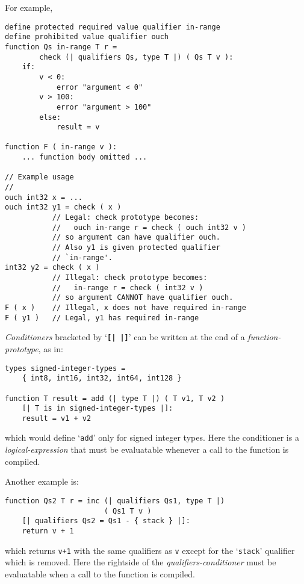 \documentclass[12pt]{article}
\newcommand{\TT}[1]{{\tt \bfseries #1}}
\newenvironment{indpar}[1][0.3in]%
	{\begin{list}{}%
		     {\setlength{\itemsep}{0in}%
		      \setlength{\topsep}{0in}%
		      \setlength{\parsep}{1ex}%
		      \setlength{\labelwidth}{#1}%
		      \setlength{\leftmargin}{#1}%
		      \addtolength{\leftmargin}{\labelsep}}%
	 \item}%
	{\end{list}}
\begin{document}
For example,
\begin{indpar}\begin{verbatim}
define protected required value qualifier in-range
define prohibited value qualifier ouch
function Qs in-range T r =
        check (| qualifiers Qs, type T |) ( Qs T v ):
    if:
        v < 0:
            error "argument < 0"
        v > 100:
            error "argument > 100"
        else:
            result = v

function F ( in-range v ):
    ... function body omitted ...

// Example usage
//
ouch int32 x = ...
ouch int32 y1 = check ( x )
           // Legal: check prototype becomes:
           //   ouch in-range r = check ( ouch int32 v )
           // so argument can have qualifier ouch.
           // Also y1 is given protected qualifier
           // `in-range'.
int32 y2 = check ( x )
           // Illegal: check prototype becomes:
           //   in-range r = check ( int32 v )
           // so argument CANNOT have qualifier ouch.
F ( x )    // Illegal, x does not have required in-range
F ( y1 )   // Legal, y1 has required in-range
\end{verbatim}\end{indpar}

{\em Conditioners} bracketed by `\TT{[|~|]}'
can be written at the end of a {\em function-prototype},
as in:
\begin{indpar}\begin{verbatim}
types signed-integer-types =
    { int8, int16, int32, int64, int128 }

function T result = add (| type T |) ( T v1, T v2 )
    [| T is in signed-integer-types |]:
    result = v1 + v2
\end{verbatim}\end{indpar}

which would define `{\tt add}' only for signed integer types.
Here the conditioner is a {\em logical-ex\-pres\-sion} that must
be evaluatable whenever a call to the function is compiled.

Another example is:
\begin{indpar}\begin{verbatim}
function Qs2 T r = inc (| qualifiers Qs1, type T |)
                       ( Qs1 T v )
    [| qualifiers Qs2 = Qs1 - { stack } |]:
    return v + 1
\end{verbatim}\end{indpar}

which returns {\tt v+1} with the same qualifiers as {\tt v}
except for the `{\tt stack}' qualifier which is removed.
Here the rightside of the {\em qualifiers-conditioner}
must be evaluatable when a call to the function is compiled.
\end{document}
